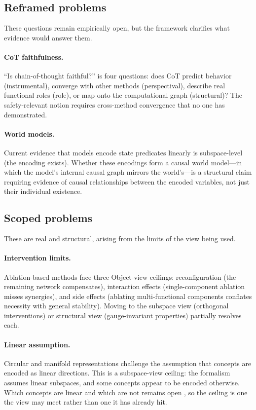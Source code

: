 \documentclass{article}
\begin{document}
\subsection{Reframed problems}

These questions remain empirically open, but the framework clarifies
what evidence would answer them.

\paragraph{CoT faithfulness.}
``Is chain-of-thought faithful?'' is four questions: does CoT predict
behavior (instrumental), converge with other methods (perspectival),
describe real functional roles (role), or map onto the computational
graph (structural)?  The safety-relevant notion requires cross-method
convergence that no one has demonstrated.

\paragraph{World models.}
Current evidence that models encode state predicates linearly is
subspace-level (the encoding exists).  Whether these encodings form a
causal world model---in which the model's internal causal graph mirrors
the world's---is a structural claim requiring evidence of causal
relationships between the encoded variables, not just their individual
existence.

\subsection{Scoped problems}

These are real and structural, arising from the limits of the view
being used.

\paragraph{Intervention limits.}
Ablation-based methods face three Object-view ceilings: reconfiguration
(the remaining network compensates), interaction effects (single-component
ablation misses synergies), and side effects (ablating multi-functional
components conflates necessity with general stability).  Moving to the
subspace view (orthogonal interventions) or structural view
(gauge-invariant properties) partially resolves each.

\paragraph{Linear assumption.}
Circular and manifold representations challenge the assumption that
concepts are encoded as linear directions.  This is a subspace-view
ceiling: the formalism assumes linear subspaces, and some concepts
appear to be encoded otherwise.  Which concepts are linear and which
are not remains open \citep{anwar2024}, so the ceiling is one the view
may meet rather than one it has already hit.
\end{document}
